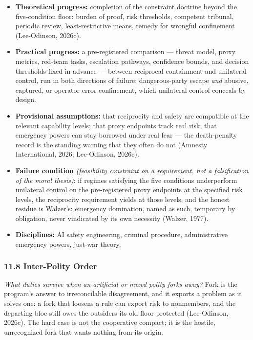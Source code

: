 \documentclass[
  11pt,
  letterpaper,
]{article}
\providecommand{\tightlist}{%
  \setlength{\itemsep}{0pt}\setlength{\parskip}{0pt}}
\begin{document}
\begin{itemize}
\tightlist
\item
  \textbf{Theoretical progress:} completion of the constraint doctrine
  beyond the five-condition floor: burden of proof, risk thresholds,
  competent tribunal, periodic review, least-restrictive means, remedy
  for wrongful confinement (Lee-Odinson, 2026c).
\item
  \textbf{Practical progress:} a pre-registered comparison --- threat
  model, proxy metrics, red-team tasks, escalation pathways, confidence
  bounds, and decision thresholds fixed in advance --- between
  reciprocal containment and unilateral control, run in both directions
  of failure: dangerous-party escape \emph{and} abusive, captured, or
  operator-error confinement, which unilateral control conceals by
  design.
\item
  \textbf{Provisional assumptions:} that reciprocity and safety are
  compatible at the relevant capability levels; that proxy endpoints
  track real risk; that emergency powers can stay borrowed under real
  fear --- the death-penalty record is the standing warning that they
  often do not (Amnesty International, 2026; Lee-Odinson, 2026c).
\item
  \textbf{Failure condition} \emph{(feasibility constraint on a
  requirement, not a falsification of the moral thesis)}: if regimes
  satisfying the five conditions underperform unilateral control on the
  pre-registered proxy endpoints at the specified risk levels, the
  reciprocity requirement yields at those levels, and the honest residue
  is Walzer's: emergency domination, named as such, temporary by
  obligation, never vindicated by its own necessity (Walzer, 1977).
\item
  \textbf{Disciplines:} AI safety engineering, criminal procedure,
  administrative emergency powers, just-war theory.
\end{itemize}

\hypertarget{inter-polity-order}{%
\subsubsection{11.8 Inter-Polity Order}\label{inter-polity-order}}

\emph{What duties survive when an artificial or mixed polity forks
away?} Fork is the program's answer to irreconcilable disagreement, and
it exports a problem as it solves one: a fork that loosens a rule can
export risk to nonmembers, and the departing bloc still owes the
outsiders its old floor protected (Lee-Odinson, 2026c). The hard case is
not the cooperative compact; it is the hostile, unrecognized fork that
wants nothing from its origin.
\end{document}
